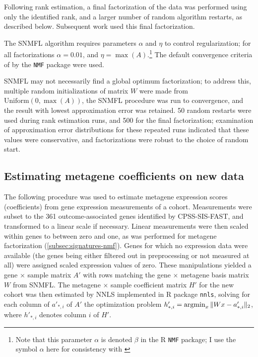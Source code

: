 \documentclass[dissertation.tex]{subfiles}
\begin{document}
Following rank estimation, a final factorization of the data was performed using only the identified rank, and a larger number of random algorithm restarts, as described below.  Subsequent work used this final factorization.

The \gls{SNMFL} algorithm requires parameters $\alpha$ and $\eta$ to control regularization; for all factorizations $\alpha = 0.01$, and $\eta = \max(A)$.\footnote{Note that this parameter $\alpha$ is denoted $\beta$ in the R \texttt{NMF} package; I use the symbol $\alpha$ here for consistency with \cite{Kim2007}}  The default convergence criteria of by the \texttt{NMF} package were used.

\gls{SNMFL} may not necessarily find a global optimum factorization; to address this, multiple random initializations of matrix $W$ were made from $\text{Uniform}(0, \max(A))$, the \gls{SNMFL} procedure was run to convergence, and the result with lowest approximation error was retained.  50 random restarts were used during rank estimation runs, and 500 for the final factorization; examination of approximation error distributions for these repeated runs indicated that these values were conservative, and factorizations were robust to the choice of random start.

\subsection{Estimating metagene coefficients on new data}
\label{subsec:sigs-metagene-est}
The following procedure was used to estimate metagene expression scores (coefficients) from gene expression measurements of a cohort.  Measurements were subset to the 361 outcome-associated genes identified by \gls{CPSS}-\gls{SIS}-\gls{FAST}, and transformed to a linear scale if necessary.  Linear measurements were then scaled within genes to between zero and one, as was performed for metagene factorization (\cref{subsec:signatures-nmf}).  Genes for which no expression data were available (the genes being either filtered out in preprocessing or not measured at all) were assigned scaled expression values of zero.  These manipulations yielded a gene $\times$ sample matrix $A'$ with rows matching the gene $\times$ metagene basis matrix $W$ from \gls{SNMFL}.  The metagene $\times$ sample coefficient matrix $H'$ for the new cohort was then estimated by \gls{NNLS} implemented in R package \texttt{nnls}, solving for each column of $a'_{*,i}$ of $A'$ the optimization problem ${h'_{*,i}} = \operatorname*{\arg\!\min}_x \| W x - a'_{*,i} \|_2$, where $h'_{*,i}$ denotes column $i$ of $H'$.
\end{document}
